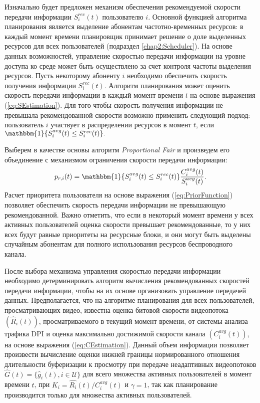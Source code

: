 Изначально будет предложен механизм обеспечения рекомендуемой скорости передачи информации $S^{rec}_i(t)$ пользователю $i$. Основной функцией алгоритма планирования является выделение абонентам частотно-временных ресурсов: в каждый момент времени планировщик принимает решение о доле выделенных ресурсов для всех пользователей (подраздел \ref{chap2:Scheduler}). На основе данных возможностей, управление скоростью передачи информации на уровне доступа ко среде может быть осуществлено за счет контроля частоты выделения ресурсов. Пусть некоторому абоненту $i$ необходимо обеспечить скорость получения информации $S^{rec}_i(t)$. Алгоритм планирования может оценить скорость передачи информации в каждый момент времени $t$ на основе выражения (\ref{eq:SEstimation}). Для того чтобы скорость получения информации не превышала рекомендованной скорости возможно применить следующий подход: пользователь $i$ участвует в распределении ресурсов в момент $t$, если $\mathbbm{1}\{S_i^{avg}(t) \leq S^{rec}_i(t)\}.$

Выберем в качестве основы алгоритм \textit{Proportional Fair} и произведем его объединение с механизмом ограничения скорости передачи информации:
\begin{equation}
\label{eq:PriorFunction}
p_{r,i}(t) = \mathbbm{1}\{S_i^{avg}(t) \leq S^{rec}_i(t)\}\frac{C_i^{avg}(t)}{S_i^{avg}(t)}.
\end{equation}
Расчет приоритета пользователя на основе выражения (\ref{eq:PriorFunction}) позволяет обеспечить скорость передачи информации не превышающую рекомендованной. Важно отметить, что если в некоторый момент времени у всех активных пользователей оценка скорости превышает рекомендованные, то у них всех будут равные приоритеты на ресурсные блоки, и они могут быть выделены случайным абонентам для полного использования ресурсов беспроводного канала.

После выбора механизма управления скоростью передачи информации необходимо детерминировать алгоритм вычисления рекомендованных скоростей передачи информации, чтобы на их основе организовать управление передачей данных. Предполагается, что на алгоритме планирования для всех пользователей, просматривающих видео, известна оценка битовой скорости видеопотока $\left(\hat{R}_i(t)\right)$, просматриваемого в текущий момент времени, от системы анализа трафика DPI и оценка максимально достижимой скорости канала $\left(C^{avg}_i(t)\right)$, на основе выражения (\ref{eq:CEstimation}). Данный объем информации позволяет произвести вычисление оценки нижней границы нормированного отношения длительности буферизации к просмотру при передаче неадаптивных видеопотоков $\hat{G}(t) = \{\hat{g}_i(t), i \in \mathcal{U}\}$ для всего множества активных пользователей в момент времени $t$, при $K_i = \hat{R_i}(t) / C^{avg}_i(t)$ и $\gamma = 1$, так как планирование производится только для множества активных пользователей.

